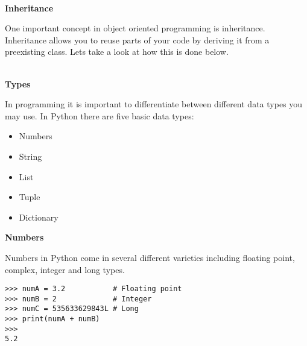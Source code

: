 \documentclass[letterpaper,11pt]{article}
\begin{document}
\\
\textbf{Inheritance}
\par{One important concept in object oriented programming is inheritance.
Inheritance allows you to reuse parts of your code by deriving it from a
preexisting class. Lets take a look at how this is done below.}
\\
\begin{minipage}{.5\textwidth}
\end{minipage}
\\
\textbf{Types}
\par{In programming it is important to differentiate between different data
types you may use. In Python there are five basic data types: }
\begin{itemize}
    \setlength\itemsep{1pt}
    \item Numbers
    \item String
    \item List
    \item Tuple
    \item Dictionary
\end{itemize}
\textbf{Numbers}
\par{Numbers in Python come in several different varieties
including floating point, complex, integer and long types.}
\\
\begin{minipage}{.5\textwidth}
    \begin{tcolorbox}
        \begin{footnotesize}
            \begin{verbatim}
>>> numA = 3.2           # Floating point
>>> numB = 2             # Integer
>>> numC = 535633629843L # Long
>>> print(numA + numB)
>>>
5.2
            \end{verbatim}
        \end{footnotesize}
    \end{tcolorbox}
\end{minipage}
\end{document}

